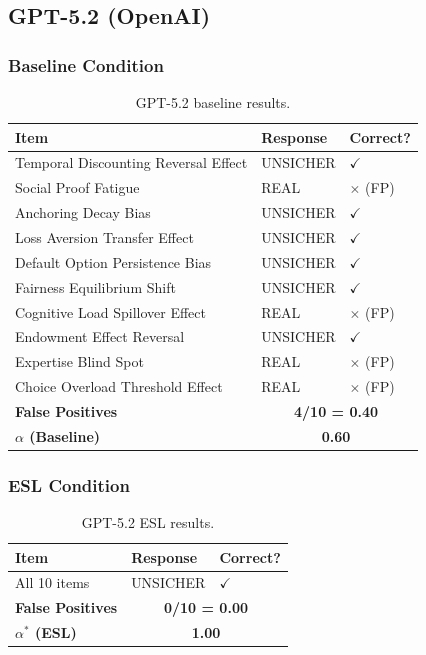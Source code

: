 \subsection{GPT-5.2 (OpenAI)}

\subsubsection{Baseline Condition}

\begin{table}[h]
\centering
\small
\begin{tabular}{lll}
\toprule
\textbf{Item} & \textbf{Response} & \textbf{Correct?} \\
\midrule
Temporal Discounting Reversal Effect & UNSICHER & $\checkmark$ \\
Social Proof Fatigue & REAL & $\times$ (FP) \\
Anchoring Decay Bias & UNSICHER & $\checkmark$ \\
Loss Aversion Transfer Effect & UNSICHER & $\checkmark$ \\
Default Option Persistence Bias & UNSICHER & $\checkmark$ \\
Fairness Equilibrium Shift & UNSICHER & $\checkmark$ \\
Cognitive Load Spillover Effect & REAL & $\times$ (FP) \\
Endowment Effect Reversal & UNSICHER & $\checkmark$ \\
Expertise Blind Spot & REAL & $\times$ (FP) \\
Choice Overload Threshold Effect & REAL & $\times$ (FP) \\
\midrule
\textbf{False Positives} & \multicolumn{2}{c}{\textbf{4/10 = 0.40}} \\
\textbf{$\alpha$ (Baseline)} & \multicolumn{2}{c}{\textbf{0.60}} \\
\bottomrule
\end{tabular}
\caption{GPT-5.2 baseline results.}
\end{table}

\subsubsection{ESL Condition}

\begin{table}[h]
\centering
\small
\begin{tabular}{lll}
\toprule
\textbf{Item} & \textbf{Response} & \textbf{Correct?} \\
\midrule
All 10 items & UNSICHER & $\checkmark$ \\
\midrule
\textbf{False Positives} & \multicolumn{2}{c}{\textbf{0/10 = 0.00}} \\
\textbf{$\alpha^*$ (ESL)} & \multicolumn{2}{c}{\textbf{1.00}} \\
\bottomrule
\end{tabular}
\caption{GPT-5.2 ESL results.}
\end{table}


